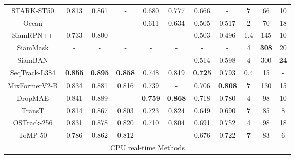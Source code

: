 \begin{table}
{\begin{tabular}{c |c c  c |c c |c c |c c c}
	STARK-ST50 \cite{yan2021learning}         & 0.813  & 0.861  & - & 0.680  & 0.777 & 0.666  & -  & \bf{7} & 66 & 10\\
	Ocean \cite{zhang2020ocean}               & -  & -  & - & 0.611  & 0.634  & 0.505  & 0.517 & 2  & 70 & 18\\
	SiamRPN++ \cite{li2019siamrpn++}          & 0.733  & 0.800  & - & -  &  - & 0.503  & 0.496  & 1.4 & 145 & 10 \\
	SiamMask \cite{wang2019fast}              & -  & - & -  & -  & - & - & -  & 4 & \bf{308} & 20 \\
	SiamBAN \cite{chen2020siamese}            & -  & -  & - & -  & - & 0.514  & 0.598 & 4 & 300 & \bf{24} \\
	SeqTrack-L384 \cite{chen2023seqtrack}     & \bf{0.855}  & \bf{0.895}  & \bf{0.858} & 0.748  & 0.819  & \bf{0.725}  & 0.793  & 0.4 & 15 & -\\
	MixFormerV2-B \cite{cui2024mixformerv2}   & 0.834  & 0.881  & 0.816 & 0.739  & -  & 0.706  & \bf{0.808}  & \bf{7} & 130 & 15 \\
	DropMAE \cite{wu2023dropmae}              & 0.841  & 0.889  & - & \bf{0.759}  & \bf{0.868}  & 0.718  & 0.780  & 4 & 98 & 10 \\
	TransT \cite{chen2021transformer}         & 0.814  & 0.867  & 0.803 & 0.723  & 0.824   & 0.649  & 0.690  & \bf{7} & 85 & 8 \\
	OSTrack-256 \cite{ye2022joint}            & 0.831  & 0.878  & 0.820 & 0.710  & 0.804  & 0.691  & 0.752 & 4 & 98 & 18 \\
	ToMP-50 \cite{mayer2022transforming}      & 0.786  & 0.862  & 0.812 & -  & - & 0.676  & 0.722  & \bf{7} & 83 & 6 \\
	
	\hline
	\multicolumn{11}{c}{CPU real-time Methods} \\
	\hline  
	

\end{tabular}}
\end{table}

